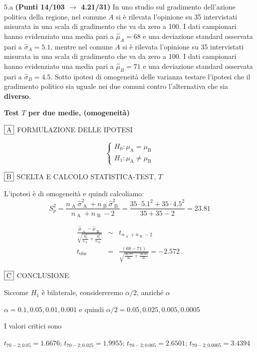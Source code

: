 \documentclass[
  11pt,
]{book}
\theoremstyle{mytheoremstyle}
\theoremstyle{mydefstyle}
\newenvironment{sol}
  {
  \begin{tcolorbox}[enhanced,breakable,arc=0.1mm,boxrule=1pt,colback=white,colframe=iblue,
  title=\bf \fontfamily{lmss}\selectfont \hspace{.5 cm} Soluzione,drop fuzzy shadow]

}{
\end{tcolorbox}
  }
\begin{document}
5.a \textbf{(Punti 14/103 \(\rightarrow\) 4.21/31)} In uno studio sul gradimento dell'azione politica della regione, nel comune \(A\) si è rilevata l'opinione su 35 intervistati misurata in una scala di gradimento che va da zero a 100. I dati campionari hanno evidenziato una media pari a \(\hat\mu_A=68\) e una deviazione standard osservata pari a \(\hat\sigma_A=5.1\), mentre nel comune \(A\) si è rilevata l'opinione su 35 intervistati misurata in una scala di gradimento che va da zero a 100. I dati campionari hanno evidenziato una media pari a \(\hat\mu_B=71\) e una deviazione standard osservata pari a \(\hat\sigma_B=4.5\). Sotto ipotesi di omogeneità delle varianza testare l'ipotesi che il gradimento politico sia uguale nei due comuni contro l'alternativa che sia \textbf{diverso}.

\begin{sol}
\textbf{Test \(T\) per due medie, (omogeneità)}

\(\fbox{A}\) FORMULAZIONE DELLE IPOTESI

\[\begin{cases}
   H_0: \mu_\text{A} = \mu_\text{B} \\
   H_1: \mu_\text{A} \neq \mu_\text{B} 
   \end{cases}\]

\(\fbox{B}\) SCELTA E CALCOLO STATISTICA-TEST, \(T\)

L'ipotesi è di omogeneità e quindi calcoliamo:\[
   S_p^2=\frac{n_\text{ A }\hat\sigma^2_\text{ A }+n_\text{ B }\hat\sigma^2_\text{ B }}{n_\text{ A }+n_\text{ B }-2} =
   \frac{ 35 \cdot 5.1 ^2+ 35 \cdot 4.5 ^2}{ 35 + 35 -2}= 23.81 
  \]

\begin{eqnarray*}
  \frac{\hat\mu_\text{ A } - \hat\mu_\text{ B }}
  {\sqrt{\frac {S^2_p}{n_\text{ A }}+\frac {S^2_p}{n_\text{ B }}}}&\sim&t_{n_\text{ A }+n_\text{ B }-2}\\
  t_{\text{obs}}
  &=& \frac{ ( 68 -  71 )} {\sqrt{\frac{ 26.77 }{ 35 }+\frac{ 20.85 }{ 35 }}}
  =   -2.572 \, .
  \end{eqnarray*}

\(\fbox{C}\) CONCLUSIONE

Siccome \(H_1\) è bilaterale, considereremo \(\alpha/2\),
anziché \(\alpha\)

\(\alpha=0.1, 0.05, 0.01, 0.001\) e quindi \(\alpha/2=0.05, 0.025, 0.005, 0.0005\)

I valori critici sono

\(t_{70-2;0.05}=1.6676\); \(t_{70-2;0.025}=1.9955\); \(t_{70-2;0.005}=2.6501\); \(t_{70-2;0.0005}=3.4394\)


\end{sol}
\end{document}
